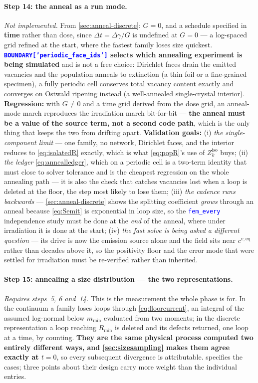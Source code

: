 \documentclass{article}
\newcommand{\textttclr}[1]{\textcolor{blue}{\texttt{#1}}}
\begin{document}
\paragraph{Step 14: the anneal as a run mode.} \emph{Not implemented.} From
\cref{sec:anneal-discrete}: $G=0$, and a schedule specified in \textbf{time}
rather than dose, since $\Delta t=\Delta\gamma/G$ is undefined at $G=0$ --- a
log-spaced grid refined at the start, where the fastest family loses size
quickest. \textbf{\textttclr{BOUNDARY['periodic\_face\_ids']} selects which
annealing experiment is being simulated} and is not a free choice: Dirichlet faces
drain the emitted vacancies and the population anneals to extinction (a thin foil
or a fine-grained specimen), a fully periodic cell conserves total vacancy content
exactly and converges on Ostwald ripening instead (a well-annealed single-crystal
interior).
\textbf{Regression:} with $G\neq0$ and a time grid derived from the dose grid, an
anneal-mode march reproduces the irradiation march bit-for-bit --- \textbf{the
anneal must be a value of the source term, not a second code path}, which is the
only thing that keeps the two from drifting apart.
\textbf{Validation goals:} (i) \emph{the single-component limit} --- one family, no
network, Dirichlet faces, and the interior reduces to \cref{eq:isolatedR} exactly,
which is what \cref{eq:popR}'s use of $Z^{\mathrm{iso}}_k$ buys; (ii) \emph{the
ledger} \cref{eq:annealledger}, which on a periodic cell is a two-term identity
that must close to solver tolerance and is the cheapest regression on the whole
annealing path --- it is also the check that catches vacancies lost when a loop is
deleted at the floor, the step most likely to lose them; (iii) \emph{the cadence
runs backwards} --- \cref{sec:anneal-discrete} shows the splitting coefficient
\emph{grows} through an anneal because \cref{eq:Semit} is exponential in loop
size, so the \textttclr{fem\_every} independence study must be done at the
\emph{end} of the anneal, where under irradiation it is done at the start;
(iv) \emph{the fast solve is being asked a different question} --- its drive is now
the emission source alone and the field sits near $c^{v,\mathrm{eq}}$ rather than
decades above it, so the positivity floor and the error mode that were settled for
irradiation must be re-verified rather than inherited.

\paragraph{Step 15: annealing a size distribution --- the two representations.}
\emph{Requires steps~5, 6 and~14.} This is the measurement the whole phase is for.
In the continuum a family loses loops through \cref{eq:floorcurrent}, an integral
of the assumed log-normal below $m_{\min}$ evaluated from two moments; in the
discrete representation a loop reaching $R_{\min}$ is deleted and its defects
returned, one loop at a time, by counting. \textbf{They are the same physical
process computed two entirely different ways, and \cref{sec:sizesampling} makes
them agree exactly at $t=0$}, so every subsequent divergence is attributable.
 specifies the cases; three points about their design carry
more weight than the individual entries.
\end{document}
